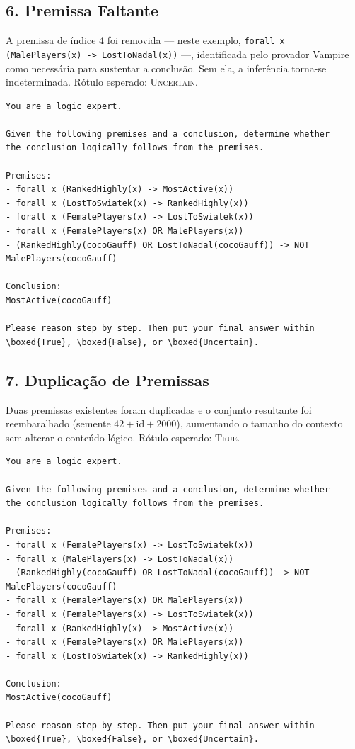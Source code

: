 \subsection{6. Premissa Faltante}
\label{ap:prompt-missing}

A premissa de índice 4 foi removida --- neste exemplo,
\texttt{forall x (MalePlayers(x) -> LostToNadal(x))} ---, identificada
pelo provador Vampire como necessária para sustentar a conclusão.
Sem ela, a inferência torna-se indeterminada.
Rótulo esperado: \textsc{Uncertain}.

\begin{lstlisting}[caption={Prompt -- condição Premissa Faltante.},
                   label={lst:prompt-missing}]
You are a logic expert.

Given the following premises and a conclusion, determine whether
the conclusion logically follows from the premises.

Premises:
- forall x (RankedHighly(x) -> MostActive(x))
- forall x (LostToSwiatek(x) -> RankedHighly(x))
- forall x (FemalePlayers(x) -> LostToSwiatek(x))
- forall x (FemalePlayers(x) OR MalePlayers(x))
- (RankedHighly(cocoGauff) OR LostToNadal(cocoGauff)) -> NOT MalePlayers(cocoGauff)

Conclusion:
MostActive(cocoGauff)

Please reason step by step. Then put your final answer within
\boxed{True}, \boxed{False}, or \boxed{Uncertain}.
\end{lstlisting}

\subsection{7. Duplicação de Premissas}
\label{ap:prompt-complex}

Duas premissas existentes foram duplicadas e o conjunto resultante foi
reembaralhado (semente $42 + \text{id} + 2000$), aumentando o tamanho do
contexto sem alterar o conteúdo lógico.
Rótulo esperado: \textsc{True}.

\begin{lstlisting}[caption={Prompt -- condição Duplicação de Premissas.},
                   label={lst:prompt-complex}]
You are a logic expert.

Given the following premises and a conclusion, determine whether
the conclusion logically follows from the premises.

Premises:
- forall x (FemalePlayers(x) -> LostToSwiatek(x))
- forall x (MalePlayers(x) -> LostToNadal(x))
- (RankedHighly(cocoGauff) OR LostToNadal(cocoGauff)) -> NOT MalePlayers(cocoGauff)
- forall x (FemalePlayers(x) OR MalePlayers(x))
- forall x (FemalePlayers(x) -> LostToSwiatek(x))
- forall x (RankedHighly(x) -> MostActive(x))
- forall x (FemalePlayers(x) OR MalePlayers(x))
- forall x (LostToSwiatek(x) -> RankedHighly(x))

Conclusion:
MostActive(cocoGauff)

Please reason step by step. Then put your final answer within
\boxed{True}, \boxed{False}, or \boxed{Uncertain}.
\end{lstlisting}

